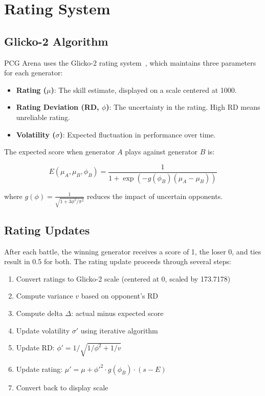 \documentclass[11pt,a4paper]{article}
\theoremstyle{plain}
\theoremstyle{definition}
\theoremstyle{remark}
\begin{document}
\section{Rating System}
\label{sec:rating}

\subsection{Glicko-2 Algorithm}
\label{subsec:glicko2}

PCG Arena uses the Glicko-2 rating system~\cite{glickman2012}, which maintains three parameters for each generator:

\begin{itemize}
    \item \textbf{Rating ($\mu$)}: The skill estimate, displayed on a scale centered at 1000.
    \item \textbf{Rating Deviation (RD, $\phi$)}: The uncertainty in the rating. High RD means unreliable rating.
    \item \textbf{Volatility ($\sigma$)}: Expected fluctuation in performance over time.
\end{itemize}

The expected score when generator $A$ plays against generator $B$ is:

\begin{equation}
E(\mu_A, \mu_B, \phi_B) = \frac{1}{1 + \exp(-g(\phi_B)(\mu_A - \mu_B))}
\end{equation}

where $g(\phi) = \frac{1}{\sqrt{1 + 3\phi^2/\pi^2}}$ reduces the impact of uncertain opponents.

\subsection{Rating Updates}
\label{subsec:rating-updates}

After each battle, the winning generator receives a score of 1, the loser 0, and ties result in 0.5 for both. The rating update proceeds through several steps:

\begin{enumerate}
    \item Convert ratings to Glicko-2 scale (centered at 0, scaled by 173.7178)
    \item Compute variance $v$ based on opponent's RD
    \item Compute delta $\Delta$: actual minus expected score
    \item Update volatility $\sigma'$ using iterative algorithm
    \item Update RD: $\phi' = 1/\sqrt{1/\phi^2 + 1/v}$
    \item Update rating: $\mu' = \mu + \phi'^2 \cdot g(\phi_B) \cdot (s - E)$
    \item Convert back to display scale
\end{enumerate}
\end{document}
